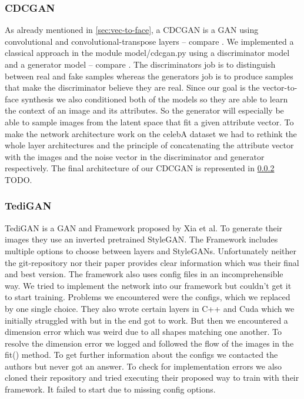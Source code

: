 \documentclass[12pt, a4paper]{article}
\begin{document}
\subsubsection{CDCGAN}
As already mentioned in \ref{sec:vec-to-face}, a CDCGAN is a GAN using convolutional and convolutional-transpose layers
-- compare \cite{dcgan}.
We implemented a classical approach in the module model/cdcgan.py using a discriminator model and a generator model --
compare \cite{gan}.
The discriminators job is to distinguish between real and fake samples whereas the generators job is to produce samples
that make the discriminator believe they are real.
Since our goal is the vector-to-face synthesis we also conditioned both of the models so they are able to learn the
context of an image and its attributes.
So the generator will especially be able to sample images from the latent space that fit a given attribute vector.
To make the network architecture work on the celebA dataset we had to rethink the whole layer architectures and the
principle of concatenating the attribute vector with the images and the noise vector in the discriminator and generator
respectively.
The final architecture of our CDCGAN is represented in \ref{} TODO.

\subsubsection{TediGAN}
TediGAN is a GAN and Framework proposed by Xia et al. To generate their images they use an inverted pretrained StyleGAN. The Framework includes multiple options to choose between layers and StyleGANs. 
Unfortunately neither the git-repository nor their paper provides clear information which was their final and best version. The framework also uses config files in an incomprehensible way. We tried to 
implement the network into our framework but couldn't get it to start training. Problems we encountered were the configs, which we replaced by one single choice. They also wrote certain layers in C++ and 
Cuda which we initially struggled with but in the end got to work. But then we encountered a dimension error which was weird due to all shapes matching one another. To resolve the dimension error we 
logged and followed the flow of the images in the fit() method. To get further information about the configs we contacted the authors but never got an answer.
To check for implementation errors we also cloned their repository and tried executing their proposed way to train with their framework. It failed to start due to missing config options.
\end{document}
